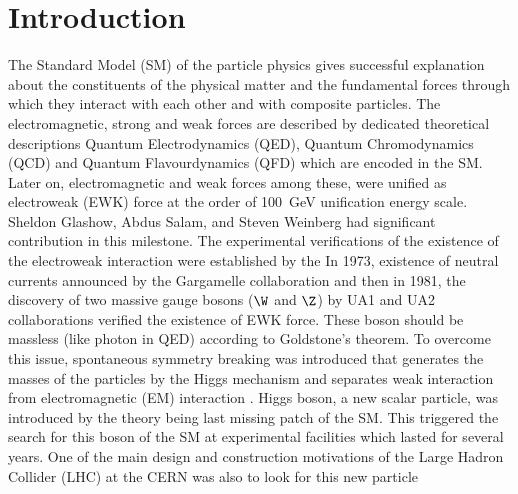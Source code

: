 \chapter{Introduction}
The Standard Model (SM) of the particle physics gives successful explanation about the constituents of the physical matter and the fundamental forces 
through which they interact with each other and with composite particles. 
The electromagnetic, strong and weak forces are described by dedicated
theoretical descriptions Quantum Electrodynamics (QED), Quantum Chromodynamics (QCD) and  Quantum Flavourdynamics (QFD) which are 
encoded in the SM. 
Later on, electromagnetic and weak forces among these, were unified as electroweak (EWK) force at the order of 100~GeV unification energy scale. 
Sheldon Glashow, Abdus Salam, and Steven Weinberg had significant contribution in this milestone. 
The experimental verifications of the existence of the electroweak interaction were established by the 
In 1973, existence of neutral currents announced by the Gargamelle collaboration and then in 1981, the discovery of two massive gauge bosons ($\W$ and $\Z$) by UA1 and  UA2 collaborations verified the existence of EWK force. 
These 
boson should be massless (like photon in QED) according to Goldstone's theorem. To overcome this issue, spontaneous symmetry breaking was introduced 
that generates the masses of the particles by the Higgs mechanism and separates weak interaction from  electromagnetic (EM) 
interaction \cite{Reference7,Reference8,Reference9,Reference10,Reference11,Reference12}. Higgs boson, a new scalar particle, was introduced by the theory being last 
missing patch of the SM. This triggered the search for this boson of the SM at experimental facilities which lasted for several years. 
One of the main design and construction motivations of the Large Hadron Collider (LHC) at the CERN was also to look for this new particle
